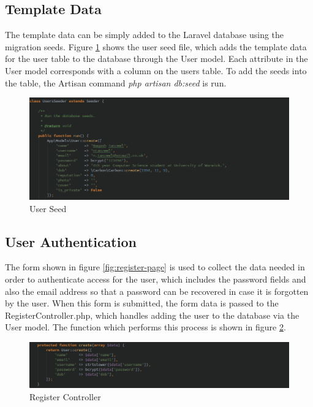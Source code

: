 \subsection{Template Data}
The template data can be simply added to the Laravel database using the migration seeds. Figure \ref{fig:seed} shows the user seed file, which adds the template data for the user table to the database through the User model. Each attribute in the User model corresponds with a column on the users table. To add the seeds into the table, the Artisan command \textit{php artisan db:seed} is run.

\begin{figure}[H]
	\centering
	\includegraphics[width=\textwidth]{Images/Implementation/seed}
	\caption{User Seed} \label{fig:seed}
\end{figure}

\subsection{User Authentication}
The form shown in figure \ref{fig:register-page} is used to collect the data needed in order to authenticate access for the user, which includes the password fields and also the email address so that a password can be recovered in case it is forgotten by the user. When this form is submitted, the form data is passed to the RegisterController.php, which handles adding the user to the database via the User model. The function which performs this process is shown in figure \ref{fig:register-controller}.

\begin{figure}[H]
	\centering
	\includegraphics[width=\textwidth]{Images/Implementation/register-controller}
	\caption{Register Controller} \label{fig:register-controller}
\end{figure}